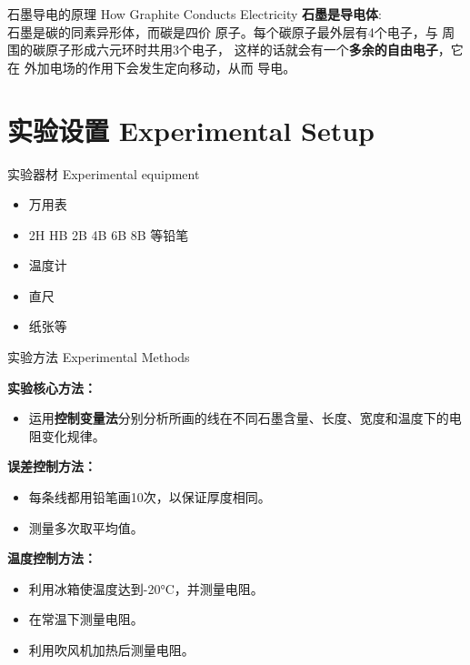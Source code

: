 \documentclass[10pt]{beamer}
\begin{document}
	
	
	
	\begin{frame}{石墨导电的原理 How Graphite Conducts Electricity}
		\textbf{石墨是导电体}:\\
		\qquad 石墨是碳的同素异形体，而碳是四价
		原子。每个碳原子最外层有4个电子，与
		周围的碳原子形成六元环时共用3个电子，
		这样的话就会有一个\textbf{多余的自由电子}，它在
		外加电场的作用下会发生定向移动，从而
		导电。
	\end{frame}
	
	\section[实验设置 Experimental Setup]{实验设置 Experimental Setup}
	\begin{frame}{实验器材 Experimental equipment}
		\begin{itemize}
			\item 万用表
			\item 2H HB 2B 4B 6B 8B 等铅笔
			\item 温度计
			\item 直尺
			\item 纸张等
		\end{itemize}
	\end{frame}
	
	
	\begin{frame}{实验方法 Experimental Methods}
		

			\textbf{实验核心方法：}
			\begin{itemize}
			\item 运用\textbf{控制变量法}分别分析所画的线在不同石墨含量、长度、宽度和温度下的电阻变化规律。\bigskip
			\end{itemize}
	
		\bigskip
	\textbf{误差控制方法：}
	\begin{itemize}
	\item 每条线都用铅笔画10次，以保证厚度相同。
	\item 测量多次取平均值。
\end{itemize}\bigskip

\textbf{温度控制方法：}
		\begin{itemize}
			\item 利用冰箱使温度达到-20°C，并测量电阻。
			\item 在常温下测量电阻。
			\item 利用吹风机加热后测量电阻。
		\end{itemize}
	\end{frame}
	
\end{document}
